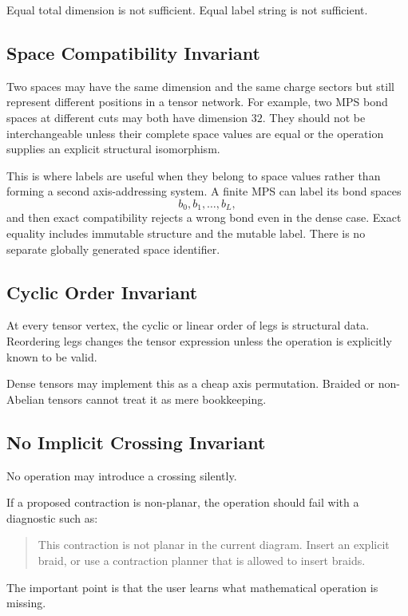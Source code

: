 \documentclass[11pt]{article}
\begin{document}
Equal total dimension is not sufficient.  Equal label string is not
sufficient.

\subsection{Space Compatibility Invariant}

Two spaces may have the same dimension and the same charge sectors but
still represent different positions in a tensor network.  For example,
two MPS bond spaces at different cuts may both have dimension \(32\).
They should not be interchangeable unless their complete space values
are equal or the operation supplies an explicit structural
isomorphism.

This is where labels are useful when they belong to space values rather
than forming a second axis-addressing system.  A finite MPS can label
its bond spaces
\[
  b_0,b_1,\ldots,b_L,
\]
and then exact compatibility rejects a wrong bond even in the dense
case.  Exact equality includes immutable structure and the mutable
label.  There is no separate globally generated space identifier.

\subsection{Cyclic Order Invariant}

At every tensor vertex, the cyclic or linear order of legs is
structural data.  Reordering legs changes the tensor expression unless
the operation is explicitly known to be valid.

Dense tensors may implement this as a cheap axis permutation.  Braided
or non-Abelian tensors cannot treat it as mere bookkeeping.

\subsection{No Implicit Crossing Invariant}

No operation may introduce a crossing silently.

If a proposed contraction is non-planar, the operation should fail with
a diagnostic such as:

\begin{quote}
This contraction is not planar in the current diagram.  Insert an
explicit braid, or use a contraction planner that is allowed to insert
braids.
\end{quote}

The important point is that the user learns what mathematical operation
is missing.
\end{document}

